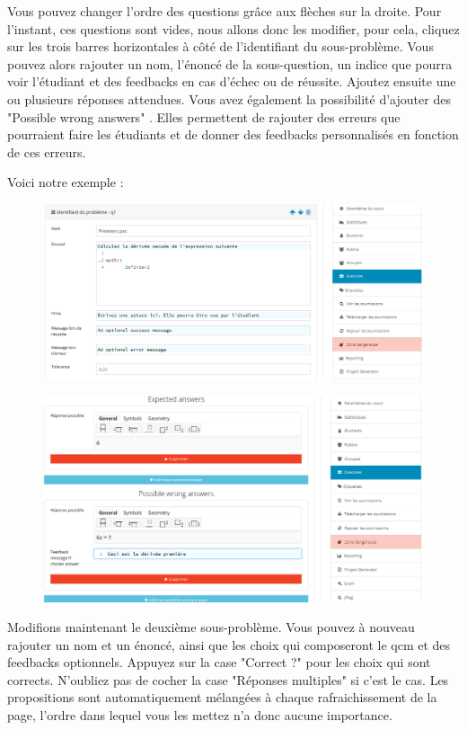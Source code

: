 \documentclass{article}
\begin{document}
Vous pouvez changer l'ordre des questions grâce aux flèches sur la droite.
Pour l'instant, ces questions sont vides, nous allons donc les modifier, pour cela, cliquez sur les trois barres horizontales à côté de l'identifiant du sous-problème. Vous pouvez alors rajouter un nom, l'énoncé de la sous-question, un indice que pourra voir l'étudiant et des feedbacks en cas d'échec ou de réussite. Ajoutez ensuite une ou plusieurs réponses attendues. Vous avez également la possibilité d'ajouter des "Possible wrong answers" . Elles permettent de rajouter des erreurs que pourraient faire les étudiants et de donner des feedbacks personnalisés en fonction de ces erreurs. 

Voici notre exemple :

\begin{figure}[!htb]
    \centering
    \includegraphics[scale=0.5]{images/sp.png}
\end{figure}

\begin{figure}[!htb]
    \centering
    \includegraphics[scale=0.5]{images/sp1.png}
\end{figure}

\newpage
Modifions maintenant le deuxième sous-problème. Vous pouvez à nouveau rajouter un nom et un énoncé, ainsi que les choix qui composeront le qcm et des feedbacks optionnels. Appuyez sur la case "Correct ?" pour les choix qui sont corrects. N'oubliez pas de cocher la case "Réponses multiples" si c'est le cas. Les propositions sont automatiquement mélangées à chaque rafraichissement de la page, l'ordre dans lequel vous les mettez n'a donc aucune importance. 
\bigskip
\end{document}
